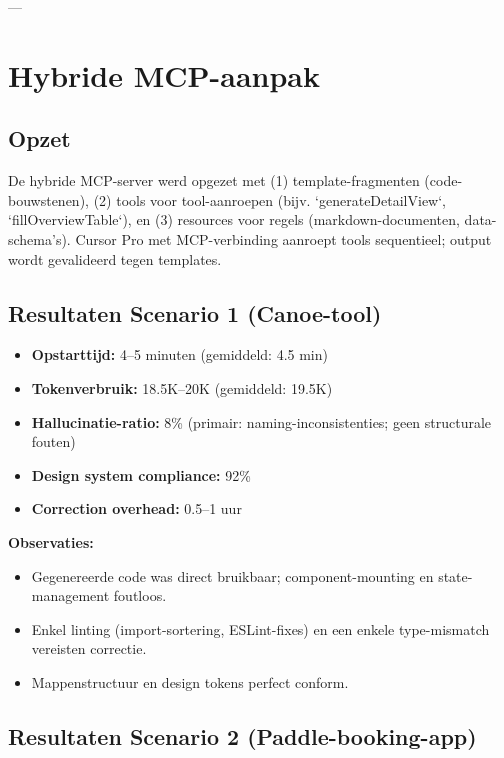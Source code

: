 ---

\section{Hybride MCP-aanpak}

\subsection{Opzet}

De hybride MCP-server werd opgezet met (1) template-fragmenten (code-bouwstenen), (2) tools voor tool-aanroepen (bijv. `generateDetailView`, `fillOverviewTable`), en (3) resources voor regels (markdown-documenten, data-schema's). Cursor Pro met MCP-verbinding aanroept tools sequentieel; output wordt gevalideerd tegen templates.

\subsection{Resultaten Scenario 1 (Canoe-tool)}

\begin{itemize}
  \item \textbf{Opstarttijd:} 4--5 minuten (gemiddeld: 4.5 min)
  \item \textbf{Tokenverbruik:} 18.5K--20K (gemiddeld: 19.5K)
  \item \textbf{Hallucinatie-ratio:} 8\% (primair: naming-inconsistenties; geen structurale fouten)
  \item \textbf{Design system compliance:} 92\%
  \item \textbf{Correction overhead:} 0.5--1 uur
\end{itemize}

\noindent
\textbf{Observaties:}
\begin{itemize}
  \item Gegenereerde code was direct bruikbaar; component-mounting en state-management foutloos.
  \item Enkel linting (import-sortering, ESLint-fixes) en een enkele type-mismatch vereisten correctie.
  \item Mappenstructuur en design tokens perfect conform.
\end{itemize}

\subsection{Resultaten Scenario 2 (Paddle-booking-app)}

